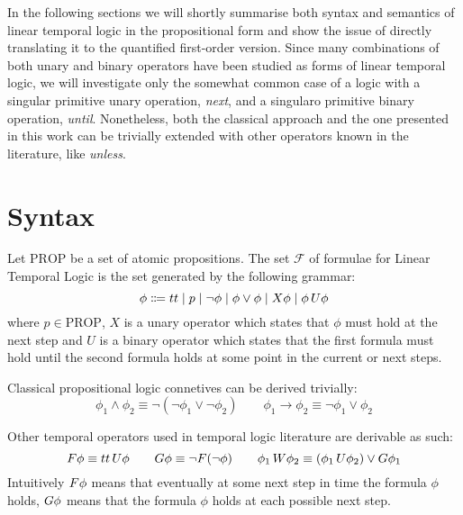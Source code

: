 In the following sections we will shortly summarise both syntax and semantics of linear temporal logic in the
propositional form and show the issue of directly translating it to the quantified first-order version.
Since many combinations of both unary and binary operators have been studied as forms of linear temporal logic, we will
investigate only the somewhat common case of a logic with a singular primitive unary operation, \emph{next}, and a
singularo primitive binary operation, \emph{until}. Nonetheless, both the classical approach and the one presented in
this work can be trivially extended with other operators known in the literature, like \emph{unless}.

\section{Syntax}

\begin{definition}
  Let $\text{PROP}$ be a set of atomic propositions. The set $\mathcal{F}$ of formulae for Linear Temporal Logic is the
  set generated by the following grammar:
  \[
    \phi \Coloneqq tt \;|\; p
                      \;|\; \neg\phi
                      \;|\; \phi \lor \phi
                      \;|\; X{\phi}
                      \;|\; {\phi}\,U {\phi}
  \]
  where $p \in \text{PROP}$, $X$ is a unary operator which states that $\phi$ must hold at the next step and $U$ is a
  binary operator which states that the first formula must hold until the second formula holds at some point in the
  current or next steps.
\end{definition}

Classical propositional logic connetives can be derived trivially:
\[
  \phi_1 \land \phi_2 \equiv \neg(\neg\phi_1 \lor \neg\phi_2) \qquad
  \phi_1 \to \phi_2 \equiv \neg\phi_1 \lor \phi_2
\]

Other temporal operators used in temporal logic literature are derivable as such:
\[
  F{\phi} \equiv {tt}\,U {\phi} \qquad
  G{\phi} \equiv \neg F{(}\neg\phi) \qquad
  {\phi_1}\,W {\phi_2} \equiv ({\phi_1}\,U {\phi_2}) \lor G{\phi_1}
\]
Intuitively $F{\phi}$ means that eventually at some next step in time the formula $\phi$ holds,
$G{\phi}$ means that the formula $\phi$ holds at each possible next step.

